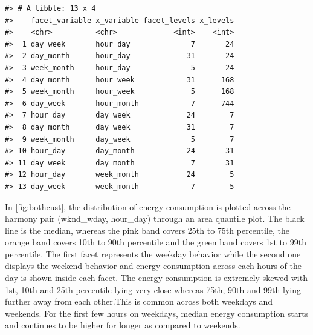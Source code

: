 \documentclass[12pt]{article}
\newenvironment{Shaded}{\begin{snugshade}}{\end{snugshade}}
\newcommand{\DataTypeTok}[1]{\textcolor[rgb]{0.13,0.29,0.53}{#1}}
\newcommand{\KeywordTok}[1]{\textcolor[rgb]{0.13,0.29,0.53}{\textbf{#1}}}
\newcommand{\NormalTok}[1]{#1}
\newcommand{\OperatorTok}[1]{\textcolor[rgb]{0.81,0.36,0.00}{\textbf{#1}}}
\newcommand{\StringTok}[1]{\textcolor[rgb]{0.31,0.60,0.02}{#1}}
\begin{document}
\begin{Shaded}
\end{Shaded}

\begin{verbatim}
#> # A tibble: 13 x 4
#>    facet_variable x_variable facet_levels x_levels
#>    <chr>          <chr>             <int>    <int>
#>  1 day_week       hour_day              7       24
#>  2 day_month      hour_day             31       24
#>  3 week_month     hour_day              5       24
#>  4 day_month      hour_week            31      168
#>  5 week_month     hour_week             5      168
#>  6 day_week       hour_month            7      744
#>  7 hour_day       day_week             24        7
#>  8 day_month      day_week             31        7
#>  9 week_month     day_week              5        7
#> 10 hour_day       day_month            24       31
#> 11 day_week       day_month             7       31
#> 12 hour_day       week_month           24        5
#> 13 day_week       week_month            7        5
\end{verbatim}

In \autoref{fig:bothcust}, the distribution of energy consumption is plotted across the harmony pair (wknd\_wday, hour\_day) through an area quantile plot.
The black line is the median, whereas the pink band covers 25th to 75th percentile, the orange band covers 10th to 90th percentile and the green band covers 1st to 99th percentile. The first facet represents the weekday behavior while the second one displays the weekend behavior and energy consumption across each hours of the day is shown inside each facet. The energy consumption is extremely skewed with 1st, 10th and 25th percentile lying very close whereas 75th, 90th and 99th lying further away from each other.This is common across both weekdays and weekends. For the first few hours on weekdays, median energy consumption starts and continues to be higher for longer as compared to weekends.
\end{document}
